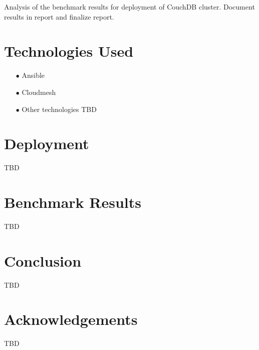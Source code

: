 \documentclass[9pt,twocolumn,twoside]{styles/osajnl}
\begin{document}
Analysis of the benchmark results for deployment of CouchDB
cluster. Document results in report and finalize report.

\section{Technologies Used}
\begin{itemize}
\item[$\bullet$] Ansible
\item[$\bullet$] Cloudmesh
\item[$\bullet$] Other technologies TBD
\end{itemize}

\section{Deployment}
TBD

\section{Benchmark Results}
TBD

\section{Conclusion}
TBD
\section*{Acknowledgements}

TBD





 
\end{document}
